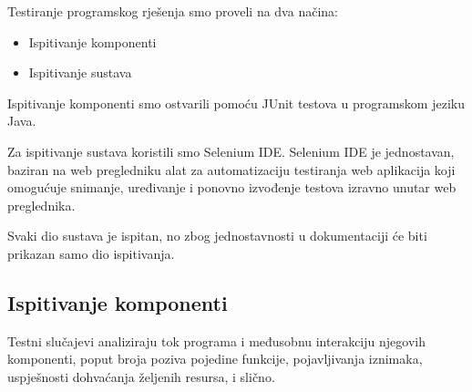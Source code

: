 			Testiranje programskog rješenja smo proveli na dva načina:
			\begin{itemize}
				\item Ispitivanje komponenti
				\item Ispitivanje sustava
			\end{itemize}
			Ispitivanje komponenti smo ostvarili pomoću JUnit testova u programskom jeziku Java.
			
			Za ispitivanje sustava koristili smo Selenium IDE. Selenium IDE je jednostavan, baziran na web pregledniku alat za automatizaciju testiranja web aplikacija koji omogućuje snimanje, uređivanje i ponovno izvođenje testova izravno unutar web preglednika.
			
			Svaki dio sustava je ispitan, no zbog jednostavnosti u dokumentaciji će biti prikazan samo dio ispitivanja.
			
			\subsection{Ispitivanje komponenti}

			Testni slučajevi analiziraju tok programa i međusobnu interakciju njegovih komponenti, poput broja poziva pojedine funkcije, pojavljivanja iznimaka, uspješnosti dohvaćanja željenih resursa, i slično.

